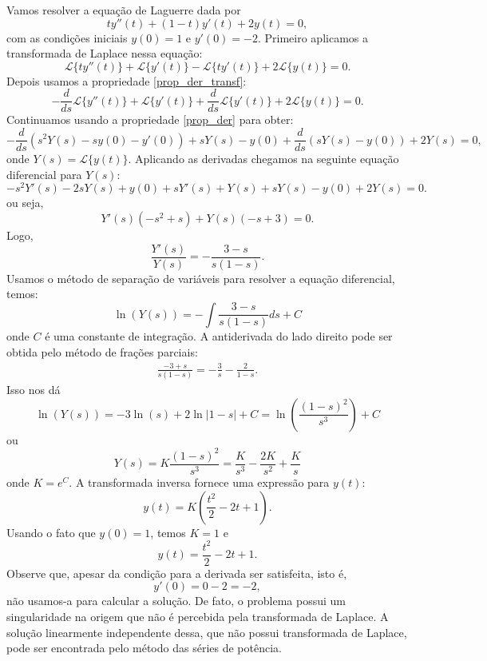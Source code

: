 \begin{ex}Vamos resolver a equação de Laguerre dada por
$$
ty''(t)+(1-t)y'(t)+2y(t)=0,
$$
com as condições iniciais $y(0)=1$ e $y'(0)=-2$. Primeiro aplicamos a transformada de Laplace nessa equação:
$$
\mathcal{L}\{ty''(t)\}+\mathcal{L}\{y'(t)\}-\mathcal{L}\{ty'(t)\}+2\mathcal{L}\{y(t)\}=0.
$$
Depois usamos a propriedade \ref{prop_der_transf}:
$$
-\frac{d}{ds}\mathcal{L}\{y''(t)\}+\mathcal{L}\{y'(t)\}+\frac{d}{ds}\mathcal{L}\{y'(t)\}+2\mathcal{L}\{y(t)\}=0.
$$
Continuamos usando a propriedade \ref{prop_der} para obter:
$$
-\frac{d}{ds}\left(s^2Y(s)-sy(0)-y'(0)\right)+sY(s)-y(0)+\frac{d}{ds}\left(sY(s)-y(0)\right)+2Y(s)=0,
$$
onde $Y(s)=\mathcal{L}\{y(t)\}$. Aplicando as derivadas chegamos na seguinte equação diferencial para $Y(s)$:
$$
-s^2Y'(s)-2sY(s)+y(0)+sY'(s)+Y(s)+sY(s)-y(0)+2Y(s)=0.
$$
ou seja,
$$
Y'(s)\left(-s^2+s\right)+Y(s)\left(-s+3\right)=0.
$$
Logo,
$$
\frac{Y'(s)}{Y(s)}=-\frac{3-s}{s(1-s)}.
$$
Usamos o método de separação de variáveis para resolver a equação diferencial, temos:
$$
\ln(Y(s))=-\int \frac{3-s}{s(1-s)} ds +C
$$
onde $C$ é uma constante de integração. A antiderivada do lado direito pode ser obtida pelo método de frações parciais:
\begin{eqnarray*}
\frac{-3+s}{s(1-s)}=-\frac{3}{s}-\frac{2}{1-s}.
\end{eqnarray*}
Isso nos dá
$$
\ln(Y(s))=-3\ln(s)+2\ln|1-s|+C=\ln\left(\frac{(1-s)^2}{s^3} \right)+C
$$
ou
$$
Y(s)=K\frac{(1-s)^2}{s^3}=\frac{K}{s^3}-\frac{2K}{s^2}+\frac{K}{s}
$$
onde $K=e^C$. A transformada inversa fornece uma expressão para $y(t)$:
$$
y(t)=K\left(\frac{t^2}{2}-2t+1\right).
$$
Usando o fato que $y(0)=1$, temos $K=1$ e
$$
y(t)=\frac{t^2}{2}-2t+1.
$$
Observe que, apesar da condição para a derivada ser satisfeita, isto é,
$$
y'(0)=0-2=-2,
$$
não usamos-a para calcular a solução. De fato, o problema possui um singularidade na origem que não é percebida pela transformada de Laplace. A solução linearmente independente dessa, que não possui transformada de Laplace, pode ser encontrada pelo método das séries de potência.
\end{ex}



